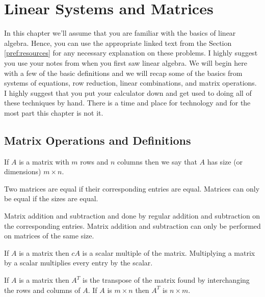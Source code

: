 \chapter{Linear Systems and Matrices}
In this chapter we'll assume that you are familiar with the basics of linear algebra.  Hence, you can use
the appropriate linked text from the Section \ref{pref:resources} for any necessary explanation on these problems.  I highly suggest you use
your notes from when you first saw linear algebra.  We will begin here
with a few of the basic definitions and we will recap some of the basics from systems of
equations, row reduction, linear combinations, and matrix operations.  I highly suggest
that you put your calculator down and get used to doing all of these techniques by hand.
There is a time and place for technology and for the most part this chapter is not it.


\section{Matrix Operations and Definitions}
\begin{definition}
    If $A$ is a matrix with $m$ rows and $n$ columns then we say that $A$ has
    size (or
    dimensions) $m \times n$.
\end{definition}

\begin{definition}
    Two matrices are equal if their corresponding entries are equal. Matrices can only be
    equal if the sizes are equal.
\end{definition}

\begin{definition} 
    Matrix addition and subtraction and done by regular addition and subtraction on the
    corresponding entries. Matrix addition and subtraction can only be performed on
    matrices of the same size.
\end{definition}

\begin{definition}
    If $A$ is a matrix then $cA$ is a scalar multiple of the matrix.  Multiplying a matrix
    by a scalar multiplies every entry by the scalar.
\end{definition}

\begin{definition} 
    If $A$ is a matrix then $A^T$
    is the transpose of the matrix found by interchanging
    the rows and columns of $A$. If $A$ is $m \times n$ then $A^T$
    is $n \times m$.
\end{definition}
    
